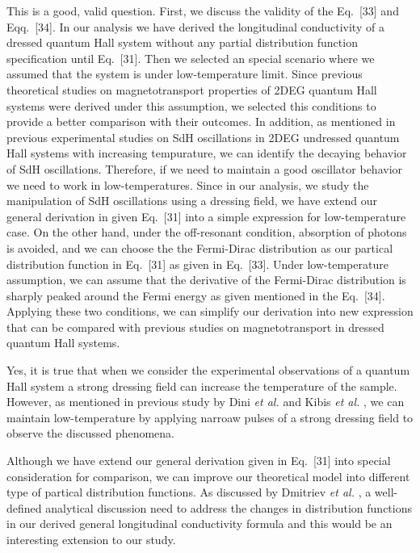\documentclass{article}
\begin{document}
This is a good, valid question. First, we discuss the validity of the Eq.~[33] and Eqq.~[34]. In our analysis we have derived the longitudinal conductivity of a dressed quantum Hall system without any partial distribution function specification until Eq.~[31]. Then we selected an special scenario where we assumed that the system is under low-temperature limit. Since previous theoretical studies on magnetotransport properties of 2DEG quantum Hall systems were derived under this assumption, we selected this conditions to provide a better comparison with their outcomes. In addition, as mentioned in previous experimental studies on SdH oscillations \cite{zudov03,mani02,arapov02} in 2DEG undressed quantum Hall systems with increasing tempurature, we can identify the decaying behavior of SdH oscillations. Therefore, if we need to maintain a good oscillator behavior we need to work in low-temperatures. Since in our analysis, we study the manipulation of SdH oscillations using a dressing field, we have extend our general derivation in given Eq.~[31] into a simple expression for low-temperature case. On the other hand, under the off-resonant condition, absorption of photons is avoided, and we can choose the the Fermi-Dirac distribution as our partical distribution function in Eq.~[31] as given in Eq.~[33]. Under low-temperature assumption, we can assume that the derivative of the Fermi-Dirac distribution is sharply peaked around the Fermi energy as given mentioned in the Eq.~[34]. Applying these two conditions, we can simplify our derivation into new expression that can be compared with previous studies on magnetotransport in dressed quantum Hall systems.

Yes, it is true that when we consider the experimental observations of a quantum Hall system a strong dressing field can increase the temperature of the sample. However, as mentioned in previous study by Dini \textit{et al.} \cite{dini16} and Kibis \textit{et al.} \cite{kibis15}, we can maintain low-temperature by applying narroaw pulses of a strong dressing field to observe the discussed phenomena.

Although we have extend our general derivation given in Eq.~[31] into special consideration for comparison, we can improve our theoretical model into different type of partical distribution functions. As discussed by Dmitriev \textit{et al.} \cite{dmitriev05}, a well-defined analytical discussion need to address the changes in distribution functions in our derived general longitudinal conductivity formula and this would be an interesting extension to our study.
\end{document}
